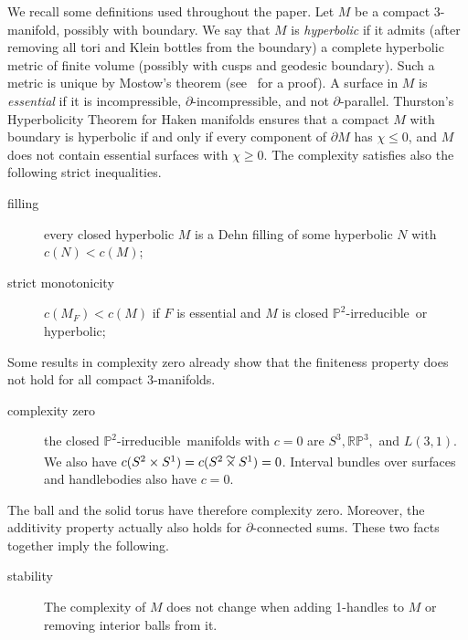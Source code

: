 \documentclass[10pt]{article}      %
\newcommand{\matP} {\ensuremath {\mathbb{P}}}
\newcommand{\matRP} {\ensuremath {\mathbb{RP}}}
\newcommand{\timtil}{\begin{picture}(12,12)
\put(2,0){$\times$}\put(2,4.5){$\sim$}\end{picture}}
\newcommand{\ptwoirred}{$\matP^2$-irreducible}
\begin{document}
We recall some definitions used throughout the paper. 
Let $M$ be a compact $3$-manifold, possibly with boundary.
We say that $M$ is \emph{hyperbolic} if it admits (after removing all tori 
and Klein bottles from the boundary) 
a complete hyperbolic metric of finite volume (possibly with cusps and geodesic
boundary). Such a metric is unique by Mostow's theorem (see~\cite{McMu} for a proof).
A surface in $M$ is \emph{essential} if it is incompressible, $\partial$-incompressible,
and not $\partial$-parallel.
Thurston's Hyperbolicity 
Theorem for Haken manifolds ensures that a compact $M$ with boundary 
is hyperbolic if and only if
every component of $\partial M$ has $\chi\leqslant 0$, and $M$
does not contain essential surfaces with $\chi\geqslant 0$.
The complexity satisfies also the following strict inequalities.
\begin{description}
\item[filling] every closed hyperbolic $M$ 
is a Dehn filling of some hyperbolic $N$ with $c(N)<c(M)$;
\end{description}
\begin{description}
\item[strict monotonicity] $c(M_F)<c(M)$ if $F$ is essential and $M$ is closed
\ptwoirred\ or hyperbolic;
\end{description}

Some results in complexity zero already show that
the finiteness property does not hold for all compact $3$-manifolds.
\begin{description}
\item[complexity zero] the closed \ptwoirred\ manifolds with $c=0$ are $S^3, 
\matRP^3,$ and $L(3,1)$. We also have $c(S^2\times S^1) = c(S^2\timtil S^1) = 0$.
Interval bundles over surfaces and handlebodies also have $c=0$.
\end{description}

The ball and the solid torus have therefore complexity zero.
Moreover, the additivity property actually also holds for $\partial$-connected sums. 
These two facts together imply the following.
\begin{description}
\item[stability]
The complexity of $M$ does not change when adding 1-handles to $M$ or removing interior
balls from it.
\end{description}
\end{document}
